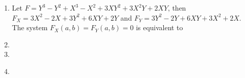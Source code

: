 \begin{solution}
    \begin{enumerate}
        \item Let $F = Y^3 - Y^2 + X^3 - X^2 + 3XY^2 + 3X^2Y + 2XY$, then $F_X = 3X^2 - 2X + 3Y^2 + 6XY + 2Y$ and $F_Y = 3Y^2 - 2Y + 6XY + 3X^2 + 2X$. The system $F_X(a,b) = F_Y(a,b) = 0$ is equivalent to \td
        \item \td
        \item \td
        \item \td \\
    \end{enumerate}
\end{solution}

\begin{exercise}
    \td \\
\end{exercise}

\begin{solution}
    \td \\
\end{solution}

\begin{exercise}
    \td \\
\end{exercise}

\begin{solution}
    \td \\
\end{solution}

\begin{exercise}
    \td \\
\end{exercise}

\begin{solution}
    \td \\
\end{solution}

\begin{exercise}
    \td \\
\end{exercise}

\begin{solution}
    \td \\
\end{solution}

\begin{exercise}
    \td \\
\end{exercise}

\begin{solution}
    \td \\
\end{solution}

